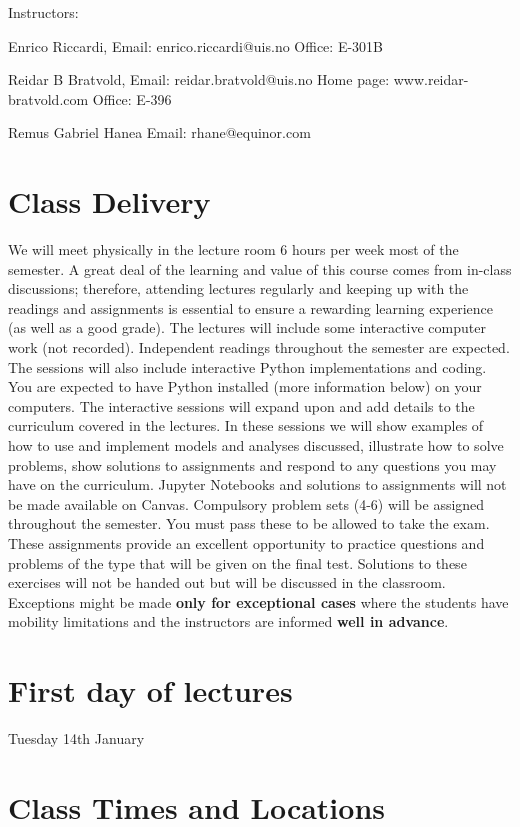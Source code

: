 \documentclass[letterpaper,12pt,oneside]{article}
\begin{document}
Instructors:

Enrico Riccardi,
Email: enrico.riccardi@uis.no
Office: E-301B

Reidar B Bratvold,
Email: reidar.bratvold@uis.no
Home page: www.reidar-bratvold.com
Office: E-396 

Remus Gabriel Hanea 
Email: rhane@equinor.com 


\section*{Class Delivery}


We will meet physically in the lecture room 6 hours per week most of the semester. A
great deal of the learning and value of this course comes from in-class discussions;
therefore, attending lectures regularly and keeping up with the readings and assignments
is essential to ensure a rewarding learning experience (as well as a good grade).
The lectures will include some interactive computer work (not recorded). Independent readings
throughout the semester are expected.
The sessions will also include interactive Python implementations and coding. You are
expected to have Python installed (more information below) on your computers.
The interactive sessions will expand upon and add details to the curriculum covered in
the lectures. In these sessions we will show examples of how to use and implement
models and analyses discussed, illustrate how to solve problems, show solutions to
assignments and respond to any questions you may have on the curriculum. Jupyter
Notebooks and solutions to assignments will not be made available on
Canvas.
Compulsory problem sets (4-6) will be assigned throughout the semester. You must pass
these to be allowed to take the exam. These assignments provide an excellent opportunity to practice
questions and problems of the type that will be given on the final test. Solutions to these
exercises will not be handed out but will be discussed in the classroom. Exceptions might be made \textbf{only for exceptional cases} where the students have mobility limitations and the instructors are informed \textbf{well in advance}.


\section*{First day of lectures}

Tuesday 14th January


\section*{Class Times and Locations}
\end{document}

